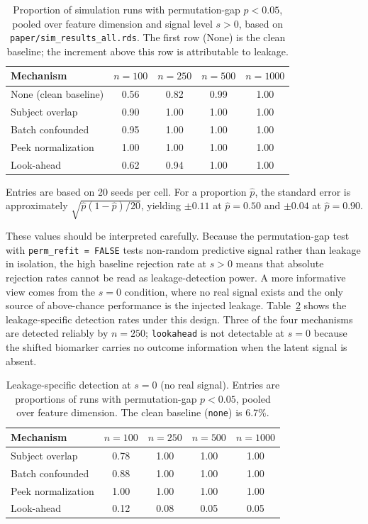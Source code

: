 \documentclass[article]{jss}
\begin{document}
\begin{table}[tbp]
\centering
\caption{Proportion of simulation runs with permutation-gap $p < 0.05$, pooled
over feature dimension and signal level $s > 0$, based on
\texttt{paper/sim\_results\_all.rds}. The first row (None) is the clean
baseline; the increment above this row is attributable to leakage.}
\label{tab:sim-power}
\begin{tabular}{|l|c|c|c|c|}
\hline
\textbf{Mechanism} & \textbf{$n=100$} & \textbf{$n=250$} & \textbf{$n=500$} & \textbf{$n=1000$} \\
\hline
None (clean baseline) & 0.56 & 0.82 & 0.99 & 1.00 \\
\hline
Subject overlap & 0.90 & 1.00 & 1.00 & 1.00 \\
\hline
Batch confounded & 0.95 & 1.00 & 1.00 & 1.00 \\
\hline
Peek normalization & 1.00 & 1.00 & 1.00 & 1.00 \\
\hline
Look-ahead & 0.62 & 0.94 & 1.00 & 1.00 \\
\hline
\end{tabular}
\end{table}

\noindent
Entries are based on 20 seeds per cell. For a proportion $\hat{p}$, the
standard error is approximately $\sqrt{\hat{p}(1-\hat{p})/20}$, yielding
$\pm 0.11$ at $\hat{p} = 0.50$ and $\pm 0.04$ at $\hat{p} = 0.90$.

These values should be interpreted carefully. Because the permutation-gap test
with \texttt{perm\_refit = FALSE} tests non-random predictive signal rather
than leakage in isolation, the high baseline rejection rate at $s > 0$ means
that absolute rejection rates cannot be read as leakage-detection power. A
more informative view comes from the $s = 0$ condition, where no real signal
exists and the only source of above-chance performance is the injected leakage.
Table~\ref{tab:sim-s0} shows the leakage-specific detection rates under this
design. Three of the four mechanisms are detected reliably by $n = 250$;
\texttt{lookahead} is not detectable at $s = 0$ because the shifted biomarker
carries no outcome information when the latent signal is absent.

\begin{table}[tbp]
\centering
\caption{Leakage-specific detection at $s = 0$ (no real signal). Entries are
proportions of runs with permutation-gap $p < 0.05$, pooled over feature
dimension. The clean baseline (\texttt{none}) is 6.7\%.}
\label{tab:sim-s0}
\begin{tabular}{|l|c|c|c|c|}
\hline
\textbf{Mechanism} & \textbf{$n=100$} & \textbf{$n=250$} & \textbf{$n=500$} & \textbf{$n=1000$} \\
\hline
Subject overlap & 0.78 & 1.00 & 1.00 & 1.00 \\
\hline
Batch confounded & 0.88 & 1.00 & 1.00 & 1.00 \\
\hline
Peek normalization & 1.00 & 1.00 & 1.00 & 1.00 \\
\hline
Look-ahead & 0.12 & 0.08 & 0.05 & 0.05 \\
\hline
\end{tabular}
\end{table}
\end{document}
